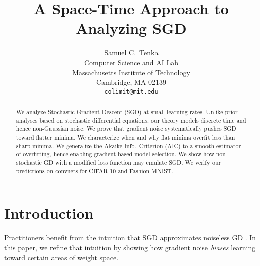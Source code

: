 \documentclass{article}
\title{%
    A Space-Time Approach to Analyzing SGD
}
\author{%
    Samuel C.~Tenka \\
    Computer Science and AI Lab \\
    Massachusetts Institute of Technology \\
    Cambridge, MA 02139 \\
    \texttt{colimit@mit.edu}
}
\theoremstyle{plain}
\theoremstyle{definition}
\begin{document}
    \maketitle
    
    
    \begin{abstract}
        We analyze Stochastic Gradient Descent (SGD) at small learning rates.
        Unlike prior analyses based on stochastic differential equations, our
        theory models discrete time and hence non-Gaussian noise.
        We prove that gradient noise systematically pushes SGD toward flatter
        minima.  We characterize when and why flat minima overfit less than
        sharp minima.  We generalize the Akaike Info.\ Criterion (AIC) to a
        smooth estimator of overfitting, hence enabling gradient-based model
        selection.  We show how non-stochastic GD with a modified loss function
        may emulate SGD.
        We verify our predictions on convnets for CIFAR-10 and Fashion-MNIST.
    \end{abstract}
    

\section{Introduction}



    Practitioners benefit from the intuition that SGD approximates noiseless
    GD \cite{bo91}.  In this paper, we refine that intuition by showing
    how gradient noise \emph{biases} learning toward certain areas of weight
    space.
    
\end{document}
